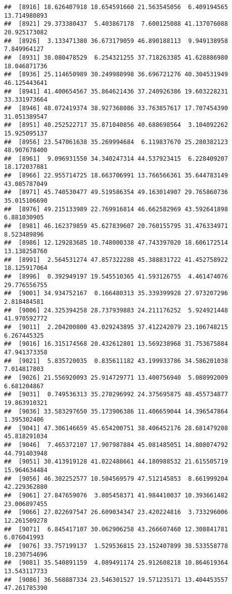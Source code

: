 \documentclass[
]{article}
\begin{document}
\begin{verbatim}
##  [8916] 18.626407918 18.654591660 21.563545056  6.409194565 13.714980893
##  [8921] 29.373380437  5.403867178  7.600125088 41.137076088 20.925173082
##  [8926]  3.133471380 36.673179059 46.890188113  9.949138958  7.849964127
##  [8931] 38.080478529  6.254321255 37.718263385 41.628886980 18.046871736
##  [8936] 25.114650989 30.249988998 36.696721276 40.304531949 46.125443641
##  [8941] 41.400654567 35.864621436 37.240926386 19.603228231 33.331973664
##  [8946] 48.072419374 38.927368086 33.763857617 17.707454390 31.051389547
##  [8951] 40.252522717 35.871040856 40.688698564  3.104092262 15.925095137
##  [8956] 23.547061638 35.269994684  6.119837670 25.280382123 48.907678400
##  [8961]  9.096931550 34.340247314 44.537923415  6.228409207 18.172037881
##  [8966] 22.955714725 18.663706991 13.766566361 35.644783149 43.085787049
##  [8971] 45.740530477 49.519586354 49.163014907 29.765860736 35.015106690
##  [8976] 49.215133989 22.769916814 46.662582969 43.592641898  6.881030905
##  [8981] 46.162379859 45.627839607 20.760155795 31.476334971  8.523489896
##  [8986] 12.129283685 10.748000338 47.743397020 18.606172514 13.138258760
##  [8991]  2.564531274 47.857322288 45.388831722 41.452758922 18.125917064
##  [8996]  0.392949197 19.545510365 41.593126755  4.461474076 29.776556755
##  [9001] 34.934752167  0.166480313 35.339399928 27.973207296  2.818484581
##  [9006] 24.325394258 28.737939883 24.211176252  5.924921448 41.970592772
##  [9011]  2.204200800 43.029243895 37.412242079 23.106748215  6.267445325
##  [9016] 16.315174568 20.432612801 13.569238968 31.753675884 47.941373358
##  [9021]  5.835720035  0.835611182 43.199933786 34.586201038  7.014817803
##  [9026] 21.556920093 25.914729771 13.400756940  5.088992009  6.681204867
##  [9031]  0.749536313 35.270296992 24.375695875 48.455734877 19.863910321
##  [9036] 33.583297650 35.173906386 11.406659044 14.396547864  1.395302406
##  [9041] 47.306146659 45.654200751 38.406452176 28.681479208 45.818291034
##  [9046]  7.465372107 17.907987884 45.081485051 14.808074792 44.791403948
##  [9051] 30.413919128 41.022488661 44.180988532 21.615505719 15.964634484
##  [9056] 46.302252577 10.504569579 47.512145853  8.661999204 42.229362880
##  [9061] 27.847659076  3.805458371 41.984410037 10.393661482 23.006897455
##  [9066] 27.822697547 26.609034347 23.420224816  3.733296006 12.261509278
##  [9071]  6.845417107 30.062906258 43.266607460 12.308841781  6.076041993
##  [9076] 33.757199137  1.529536815 23.152407899 38.533558778 18.230754696
##  [9081] 35.540891159  4.089491174 25.912608218 10.864619364 13.543117733
##  [9086] 36.568887334 23.546301527 19.571235171 13.404453557 47.261785390

\end{verbatim}
\end{document}
